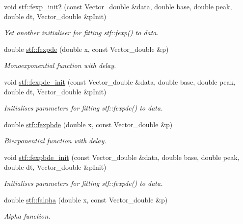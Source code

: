 \begin{DoxyCompactItemize}
void \hyperlink{group__stfgen_ga52d567f013f039416a245b985af83bbf}{stf::fexp\_\-init2} (const Vector\_\-double \&data, double base, double peak, double dt, Vector\_\-double \&pInit)
\begin{DoxyCompactList}\small\item\em Yet another initialiser for fitting stf::fexp() to {\itshape data\/}. \item\end{DoxyCompactList}\item 
double \hyperlink{group__stfgen_ga214dc6bb2e3a2ad37ab9e4650b55c632}{stf::fexpde} (double x, const Vector\_\-double \&p)
\begin{DoxyCompactList}\small\item\em Monoexponential function with delay. \item\end{DoxyCompactList}\item 
void \hyperlink{group__stfgen_ga4c3336556c6aa992cf19e1b2e4ec7a76}{stf::fexpde\_\-init} (const Vector\_\-double \&data, double base, double peak, double dt, Vector\_\-double \&pInit)
\begin{DoxyCompactList}\small\item\em Initialises parameters for fitting stf::fexpde() to {\itshape data\/}. \item\end{DoxyCompactList}\item 
double \hyperlink{group__stfgen_ga4dd9d335d263c75d61961db8bb1fe1e2}{stf::fexpbde} (double x, const Vector\_\-double \&p)
\begin{DoxyCompactList}\small\item\em Biexponential function with delay. \item\end{DoxyCompactList}\item 
void \hyperlink{group__stfgen_gaf0561e7b630cce2263693f8e86167eea}{stf::fexpbde\_\-init} (const Vector\_\-double \&data, double base, double peak, double dt, Vector\_\-double \&pInit)
\begin{DoxyCompactList}\small\item\em Initialises parameters for fitting stf::fexpde() to {\itshape data\/}. \item\end{DoxyCompactList}\item 
double \hyperlink{group__stfgen_gafa6594e79d6dd700e3dfc91528f5be56}{stf::falpha} (double x, const Vector\_\-double \&p)
\begin{DoxyCompactList}\small\item\em Alpha function. \item\end{DoxyCompactList}\item 

\end{DoxyCompactItemize}

